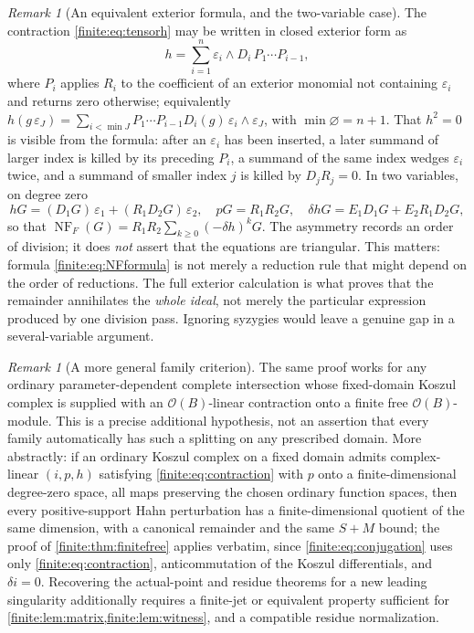 \documentclass[11pt,letterpaper]{article}
\theoremstyle{definition}
\theoremstyle{remark}
\newtheorem{remark}[theorem]{Remark}
\newcommand{\OO}{\mathcal O}
\DeclareMathOperator{\NF}{NF}
\numberwithin{equation}{section}
\begin{document}
\begin{remark}[An equivalent exterior formula, and the two-variable case]
\label{finite:rem:exteriorh}
The contraction \eqref{finite:eq:tensorh} may be written in closed exterior form as
\begin{equation}\label{finite:eq:exteriorh}
 h=\sum_{i=1}^{n}\varepsilon_i\wedge D_i\,P_1\cdots P_{i-1},
\end{equation}
where $P_i$ applies $R_i$ to the coefficient of an exterior monomial not containing $\varepsilon_i$ and returns zero otherwise; equivalently $h(g\,\varepsilon_J)=\sum_{i<\min J}P_1\cdots P_{i-1}D_i(g)\,\varepsilon_i\wedge\varepsilon_J$, with $\min\varnothing=n+1$. That $h^2=0$ is visible from the formula: after an $\varepsilon_i$ has been inserted, a later summand of larger index is killed by its preceding $P_i$, a summand of the same index wedges $\varepsilon_i$ twice, and a summand of smaller index $j$ is killed by $D_jR_j=0$. In two variables, on degree zero
\[
 hG=(D_1G)\,\varepsilon_1+(R_1D_2G)\,\varepsilon_2,
 \quad pG=R_1R_2G,
 \quad
 \delta hG=E_1D_1G+E_2R_1D_2G,
\]
so that $\NF_F(G)=R_1R_2\sum_{k\geq0}(-\delta h)^kG$. The asymmetry records an order of division; it does \emph{not} assert that the equations are triangular. This matters: formula \eqref{finite:eq:NFformula} is not merely a reduction rule that might depend on the order of reductions. The full exterior calculation is what proves that the remainder annihilates the \emph{whole ideal}, not merely the particular expression produced by one division pass. Ignoring syzygies would leave a genuine gap in a several-variable argument.
\end{remark}

\begin{remark}[A more general family criterion]
\label{finite:rem:familycriterion}
The same proof works for any ordinary parameter-dependent complete intersection whose fixed-domain Koszul complex is supplied with an $\OO(B)$-linear contraction onto a finite free $\OO(B)$-module. This is a precise additional hypothesis, not an assertion that every family automatically has such a splitting on any prescribed domain. More abstractly: if an ordinary Koszul complex on a fixed domain admits complex-linear $(i,p,h)$ satisfying \eqref{finite:eq:contraction} with $p$ onto a finite-dimensional degree-zero space, all maps preserving the chosen ordinary function spaces, then every positive-support Hahn perturbation has a finite-dimensional quotient of the same dimension, with a canonical remainder and the same $S+M$ bound; the proof of \cref{finite:thm:finitefree} applies verbatim, since \eqref{finite:eq:conjugation} uses only \eqref{finite:eq:contraction}, anticommutation of the Koszul differentials, and $\delta i=0$. Recovering the actual-point and residue theorems for a new leading singularity additionally requires a finite-jet or equivalent property sufficient for \cref{finite:lem:matrix,finite:lem:witness}, and a compatible residue normalization.
\end{remark}
\end{document}
